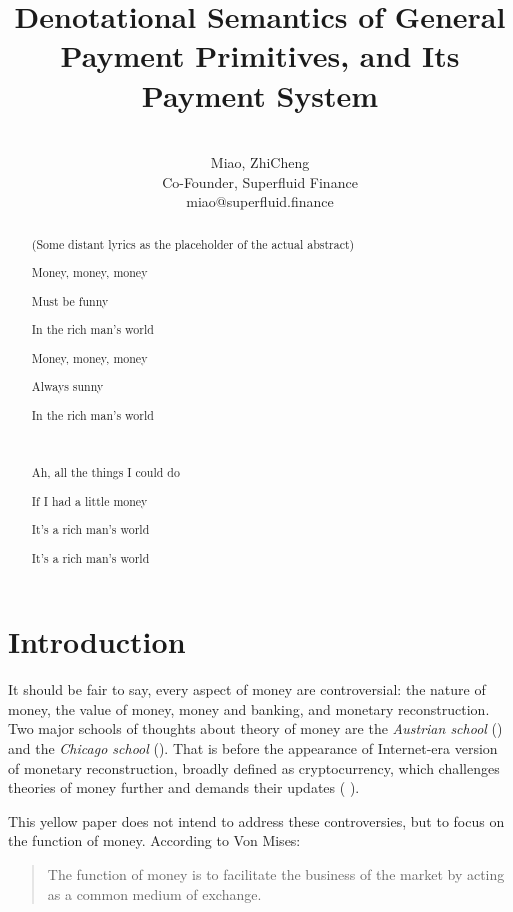 \documentclass[a4paper,10pt]{report}
\title{Denotational Semantics of General Payment Primitives, and Its Payment System}
\author{\\
    Miao, ZhiCheng\\
    Co-Founder, Superfluid Finance\\
    miao@superfluid.finance
}
\begin{document}
\maketitle

\begin{abstract}
    \begin{center}
        (Some distant lyrics as the placeholder of the actual abstract)

        Money, money, money

        Must be funny

        In the rich man's world

        Money, money, money

        Always sunny

        In the rich man's world

        \

        Ah, all the things I could do

        If I had a little money

        It's a rich man's world

        It's a rich man's world
    \end{center}
\end{abstract}

\chapter{Introduction}

It should be fair to say, every aspect of money are controversial: the nature of money, the value of money, money and
banking, and monetary reconstruction. Two major schools of thoughts about theory of money are the \textit{Austrian
    school} (\cite{von2013theory}) and the \textit{Chicago school} (\cite{friedman1989quantity}). That is before the
appearance of Internet-era version of monetary reconstruction, broadly defined as cryptocurrency, which challenges
theories of money further and demands their updates (\cite{ammous2018can} \cite{hardle2020understanding}).

This yellow paper does not intend to address these controversies, but to focus on the function of money. According to
Von Mises:

\begin{quotation}
The function of money is to facilitate the business of the market by acting as a common medium of
exchange. 
\end{quotation}
\end{document}
